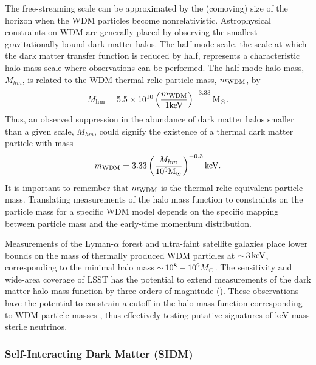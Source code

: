 The free-streaming scale can be approximated by the (comoving) size of the horizon when the WDM particles become nonrelativistic. 
Astrophysical constraints on WDM are generally placed by observing the smallest gravitationally bound dark matter halos.  
The half-mode scale, the scale at which the dark matter transfer function is reduced by half, represents a characteristic halo mass scale where observations can be performed. 
The half-mode halo mass, $M_{hm}$, is related to the WDM thermal relic particle mass, $m_{\rm WDM}$, by \citep[\eg][]{schneider2012,Bullock:2017xww}
\begin{equation} \label{eqn:Mhm}
    M_{\rm hm} = 5.5 \times 10^{10} \left( \frac{m_{\rm WDM}}{1 {\rm keV}} \right)^{-3.33} {\rm M_\odot}.
\end{equation}
Thus, an observed suppression in the abundance of dark matter halos smaller than a given scale, $M_{hm}$, could signify the existence of a thermal dark matter particle with mass
\begin{equation}
    m_{\rm WDM} =  3.33 \left(\frac{M_{hm}}{10^{9} {\rm M_\odot}} \right)^{-0.3} {\rm keV}.
\end{equation}
It is important to remember that $m_{\rm WDM}$ is the thermal-relic-equivalent particle mass. Translating measurements of the halo mass function to constraints on the particle mass for a specific WDM model depends on the specific mapping between particle mass and the early-time momentum distribution.

Measurements of the Lyman-$\alpha$ forest \citep[\eg][]{Viel:2013,2017PhRvD..96b3522I} and ultra-faint satellite galaxies \citep[\eg][]{Jethwa:2018,Kim:2017iwr,Nadler:2018}  place lower bounds on the mass of thermally produced WDM particles at $ {\sim}\, 3\mathrm{\,keV}$, corresponding to the minimal halo mass $ {\sim}\, 10^8-10^9 M_\odot$.
The sensitivity and wide-area coverage of LSST has the potential to extend measurements of the dark matter halo mass function by three orders of magnitude (). 
These observations have the potential to constrain a cutoff in the halo mass function corresponding to WDM particle masses , thus effectively testing putative signatures of keV-mass sterile neutrinos.


\subsubsection{Self-Interacting Dark Matter (SIDM)}
\label{sec:sidm}

